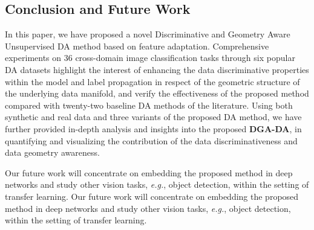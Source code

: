 \documentclass[journal,twocolumn]{IEEEtran}
\begin{document}
\begin{CJK*}{UTF8}{gkai}

		



								
							
\section{Conclusion and Future Work}
In this paper, we have proposed a novel Discriminative and Geometry Aware Unsupervised DA method based on feature adaptation. Comprehensive experiments on 36 cross-domain image classification tasks through six popular DA datasets highlight the interest of enhancing the data discriminative properties within the model and label propagation in respect of the geometric structure of the underlying data manifold, and  verify the effectiveness of the proposed method compared with twenty-two baseline DA methods of the literature. Using both synthetic and real data and three variants of the proposed DA method, we have further provided in-depth analysis and insights into the proposed \textbf{DGA-DA}, in quantifying and visualizing the contribution of the data discriminativeness and data geometry awareness.   
								

								
Our future work will concentrate on embedding the proposed method in  deep  networks and study other vision tasks, \textit{e.g.}, object detection, within the setting of transfer learning.
Our future work will concentrate on embedding the proposed method in  deep  networks and study other vision tasks, \textit{e.g.}, object detection, within the setting of transfer learning.
								






\end{CJK*}
\end{document}
